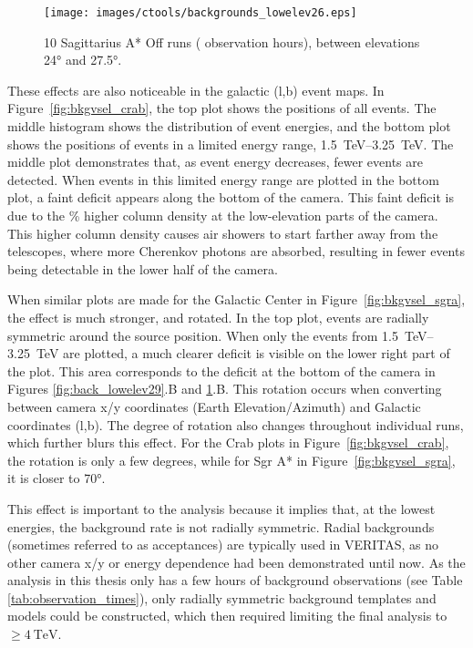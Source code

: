     \begin{figure}[ht]
      \centering
      \texttt{[image: images/ctools/backgrounds\_lowelev26.eps]}
      \caption[CTOOLS Background at \ang{26} Elevation]{
        10 Sagittarius A* Off runs ( observation hours), between elevations \ang{24} and \ang{27.5}. 
      }
      \label{fig:back_lowelev26}
    \end{figure}
  
  These effects are also noticeable in the galactic (l,b) event maps.
  In Figure~\ref{fig:bkgvsel_crab}, the top plot shows the positions of all events.
  The middle histogram shows the distribution of event energies, and the bottom plot shows the positions of events in a limited energy range, \SIrange{1.5}{3.25}{\TeV}.
  The middle plot demonstrates that, as event energy decreases, fewer events are detected.
  When events in this limited energy range are plotted in the bottom plot, a faint deficit appears along the bottom of the camera.
  This faint deficit is due to the \% higher column density at the low-elevation parts of the camera.
  This higher column density causes air showers to start farther away from the telescopes, where more Cherenkov photons are absorbed, resulting in fewer events being detectable in the lower half of the camera.

  When similar plots are made for the Galactic Center in Figure~\ref{fig:bkgvsel_sgra}, the effect is much stronger, and rotated.
  In the top plot, events are radially symmetric around the source position.
  When only the events from \SIrange{1.5}{3.25}{\TeV} are plotted, a much clearer deficit is visible on the lower right part of the plot.
  This area corresponds to the deficit at the bottom of the camera in Figures \ref{fig:back_lowelev29}.B and \ref{fig:back_lowelev26}.B.
  This rotation occurs when converting between camera x/y coordinates (Earth Elevation/Azimuth) and Galactic coordinates (l,b).
  The degree of rotation also changes throughout individual runs, which further blurs this effect.
  For the Crab plots in Figure~\ref{fig:bkgvsel_crab}, the rotation is only a few degrees, while for Sgr A* in Figure~\ref{fig:bkgvsel_sgra}, it is closer to \ang{70}.
  
  This effect is important to the analysis because it implies that, at the lowest energies, the background rate is not radially symmetric.
  Radial backgrounds (sometimes referred to as acceptances) are typically used in VERITAS, as no other camera x/y or energy dependence had been demonstrated until now.
  As the analysis in this thesis only has a few hours of background observations (see Table \ref{tab:observation_times}), only radially symmetric background templates and models could be constructed, which then required limiting the final analysis to $\geq\SI{4}{\TeV}$.
  
